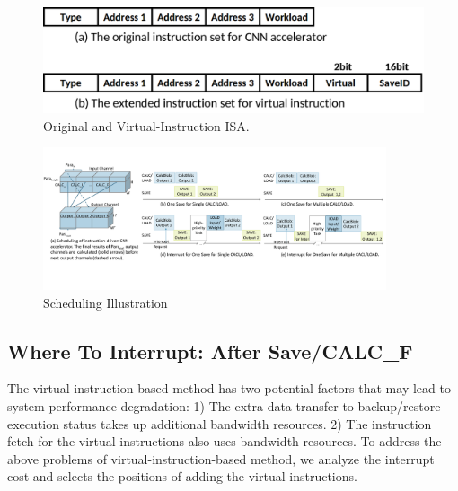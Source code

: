 




\begin{figure}[t]
	\centering
    \vspace{-0.1cm} 
    \setlength{\abovecaptionskip}{0cm} 
    \setlength{\belowcaptionskip}{-0.05cm} 
	\includegraphics[width=0.99\linewidth]{fig/instructions.png}
	\caption{Original and Virtual-Instruction ISA.}
	\label{fig:instructions}
\end{figure}



\begin{figure}[t]
    \centering
    \vspace{-0.1cm} 
    \setlength{\abovecaptionskip}{0cm} 
    \setlength{\belowcaptionskip}{-0.05cm} 
	\includegraphics[width=0.9\textwidth]{fig/singlesave.pdf} 	
    \caption{
		Scheduling Illustration
    }
	\label{fig:singlesave}
\end{figure}



\subsection{ Where To Interrupt: After Save/CALC\_F }
\label{sec:whereinter}
The virtual-instruction-based method has two potential factors that may lead to system performance degradation: 1) The extra data transfer to backup/restore execution status takes up additional bandwidth resources. 2) The instruction fetch for the virtual instructions also uses bandwidth resources.
To address the above problems of virtual-instruction-based method, we analyze the interrupt cost and selects the positions of adding the virtual instructions.

